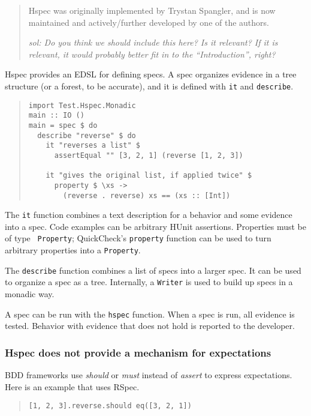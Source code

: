 \documentclass[preprint]{sigplanconf}
\begin{document}
\begin{quote}
    Hspec was originally implemented by Trystan Spangler, and is now
    maintained and actively/further developed by one of the authors.

    \emph{sol: Do you think we should include this here? Is it
    relevant? If it is relevant, it would probably better fit in to
    the ``Introduction'', right?}
\end{quote}

Hspec provides an EDSL for defining specs.  A spec organizes evidence
in a tree structure (or a forest, to be accurate), and it is defined
with \texttt{it} and \texttt{describe}.

\begin{quote}
\small
\begin{verbatim}
import Test.Hspec.Monadic
main :: IO ()
main = spec $ do
  describe "reverse" $ do
    it "reverses a list" $
      assertEqual "" [3, 2, 1] (reverse [1, 2, 3])

    it "gives the original list, if applied twice" $
      property $ \xs ->
        (reverse . reverse) xs == (xs :: [Int])
\end{verbatim}
\end{quote}

\noindent The {\tt it} function combines a text description for a
behavior and some evidence into a spec.
Code examples can be arbitrary HUnit assertions.  Properties must be of type {\tt
Property}; QuickCheck's \texttt{property} function can be used to turn
arbitrary properties into a \texttt{Property}.

The \texttt{describe} function combines a list of specs into a larger spec.
It can be used to organize a spec as a tree.
Internally, a \texttt{Writer} is used to build up specs in a monadic way.

A spec can be run with the \texttt{hspec} function.  When a spec is
run, all evidence is tested.  Behavior with evidence that does not
hold is reported to the developer.

\subsubsection{Hspec does not provide a mechanism for expectations}
BDD frameworks use \emph{should} or \emph{must} instead of
\emph{assert} to express expectations.  Here is an example that uses
RSpec.

\begin{quote}\small\begin{verbatim}
[1, 2, 3].reverse.should eq([3, 2, 1])
\end{verbatim}\end{quote}
\end{document}
